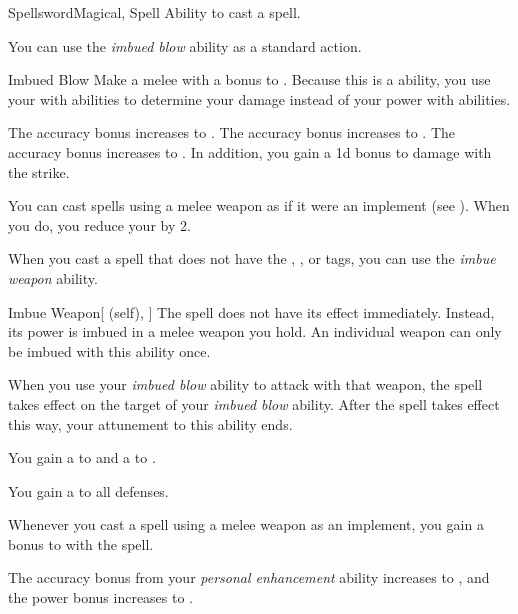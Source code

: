     \begin{feat}{Spellsword}{Magical, Spell}
        \featpre Ability to cast a spell.

         You can use the \textit{imbued blow} ability as a standard action.
        \begin{freeability}{Imbued Blow}
            Make a melee  with a  bonus to .
            Because this is a  ability, you use your  with  abilities to determine your damage instead of your power with  abilities.

            \rankline
             The accuracy bonus increases to .
             The accuracy bonus increases to .
             The accuracy bonus increases to .
                In addition, you gain a \plus1d bonus to damage with the strike.
        \end{freeability}

         You can cast spells using a melee weapon as if it were an implement (see ).
        When you do, you reduce your  by 2.

         When you cast a spell that does not have the , , or  tags,
            you can use the \textit{imbue weapon} ability.
        \begin{attuneability}{Imbue Weapon}[ (self), ]
            The spell does not have its effect immediately.
            Instead, its power is imbued in a melee weapon you hold.
            An individual weapon can only be imbued with this ability once.

            When you use your \textit{imbued blow} ability to attack with that weapon, the spell takes effect on the target of your \textit{imbued blow} ability.
            After the spell takes effect this way, your attunement to this ability ends.
        \end{attuneability}

         You gain a   to  and a   to .

         You gain a   to all defenses.

         Whenever you cast a spell using a melee weapon as an implement, you gain a  bonus to  with the spell.

         The accuracy bonus from your \textit{personal enhancement} ability increases to , and the power bonus increases to .
    \end{feat}

